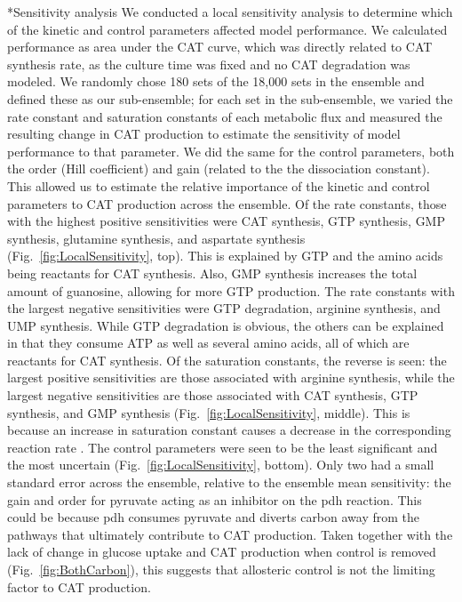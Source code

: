 \documentclass[12pt]{article}
\makeatletter
\renewcommand\subsection{\@startsection
	{subsection}{2}{0mm}
	{-0.05in}
	{-0.5\baselineskip}
	{\normalfont\normalsize\bfseries}}
\makeatother
\begin{document}
\subsection*{Sensitivity analysis}
We conducted a local sensitivity analysis to determine which of the kinetic and control parameters affected model performance.
We calculated performance as area under the CAT curve, which was directly related to CAT synthesis rate, as the culture time was fixed and no CAT degradation was modeled.
We randomly chose 180 sets of the 18,000 sets in the ensemble and defined these as our sub-ensemble; for each set in the sub-ensemble, we varied the rate constant and saturation constants of each metabolic flux and measured the resulting change in CAT production to estimate the sensitivity of model performance to that parameter.
We did the same for the control parameters, both the order (Hill coefficient) and gain (related to the the dissociation constant).
This allowed us to estimate the relative importance of the kinetic and control parameters to CAT production across the ensemble.
Of the rate constants, those with the highest positive sensitivities were CAT synthesis, GTP synthesis, GMP synthesis, glutamine synthesis, and aspartate synthesis (Fig.~\ref{fig:LocalSensitivity}, top).
This is explained by GTP and the amino acids being reactants for CAT synthesis.
Also, GMP synthesis increases the total amount of guanosine, allowing for more GTP production.
The rate constants with the largest negative sensitivities were GTP degradation, arginine synthesis, and UMP synthesis.
While GTP degradation is obvious, the others can be explained in that they consume ATP as well as several amino acids, all of which are reactants for CAT synthesis.
Of the saturation constants, the reverse is seen: the largest positive sensitivities are those associated with arginine synthesis, while the largest negative sensitivities are those associated with CAT synthesis, GTP synthesis, and GMP synthesis (Fig.~\ref{fig:LocalSensitivity}, middle).
This is because an increase in saturation constant causes a decrease in the corresponding reaction rate \cite{?}.
The control parameters were seen to be the least significant and the most uncertain (Fig.~\ref{fig:LocalSensitivity}, bottom).
Only two had a small standard error across the ensemble, relative to the ensemble mean sensitivity: the gain and order for pyruvate acting as an inhibitor on the pdh reaction.
This could be because pdh consumes pyruvate and diverts carbon away from the pathways that ultimately contribute to CAT production.
Taken together with the lack of change in glucose uptake and CAT production when control is removed (Fig.~\ref{fig:BothCarbon}), this suggests that allosteric control is not the limiting factor to CAT production.
\end{document}
